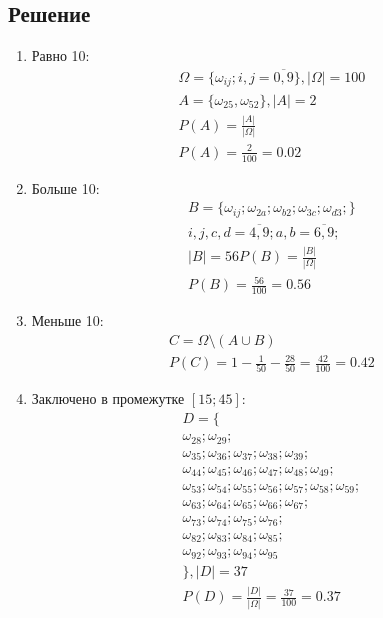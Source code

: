 \documentclass[12pt]{article}
\begin{document}
\subsection*{Решение}
\begin{enumerate}
	\item Равно 10:
	      \begin{gather*}
		      \Omega = \{\omega_{ij}; i, j = \overline{0, 9}\}, |\Omega| = 100 \\
		      A = \{\omega_{25}, \omega_{52}\}, |A| = 2 \\
		      P(A) = \frac{|A|}{|\Omega|} \\
		      P(A) = \frac{2}{100} = 0.02
	      \end{gather*}
	\item Больше 10:
	      \begin{gather*}
		      B = \{\omega_{ij}; \omega_{2a}; \omega_{b2}; \omega_{3c}; \omega_{d3}; \} \\
		      i, j, c, d = \overline{4, 9}; a, b = \overline{6, 9}; \\
		      |B| = 56
		      P(B) = \frac{|B|}{|\Omega|} \\
		      P(B) = \frac{56}{100} = 0.56
	      \end{gather*}
	\item Меньше 10:
	      \begin{gather*}
		      C = \Omega \setminus (A \cup B) \\
		      P(C) = 1 - \frac{1}{50} - \frac{28}{50} = \frac{42}{100} = 0.42
	      \end{gather*}
	\item Заключено в промежутке $[15; 45]$:
	      \begin{gather*}
		      D = \{ \\
		      \omega_{28}; \omega_{29}; \\
		      \omega_{35}; \omega_{36}; \omega_{37}; \omega_{38}; \omega_{39}; \\
		      \omega_{44}; \omega_{45}; \omega_{46}; \omega_{47}; \omega_{48}; \omega_{49}; \\
		      \omega_{53}; \omega_{54}; \omega_{55}; \omega_{56}; \omega_{57}; \omega_{58}; \omega_{59}; \\
		      \omega_{63}; \omega_{64}; \omega_{65}; \omega_{66}; \omega_{67}; \\
		      \omega_{73}; \omega_{74}; \omega_{75}; \omega_{76}; \\
		      \omega_{82}; \omega_{83}; \omega_{84}; \omega_{85}; \\
		      \omega_{92}; \omega_{93}; \omega_{94}; \omega_{95} \\
		      \}, |D| = 37 \\
		      P(D) = \frac{|D|}{|\Omega|} = \frac{37}{100} = 0.37
	      \end{gather*}
\end{enumerate}
\end{document}
